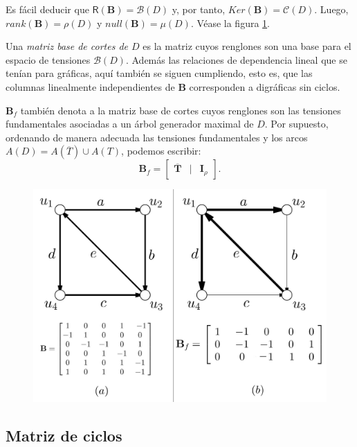 Es fácil deducir que  $\mathsf{R}(\mathbf{B}) =\mathcal{B}(D)$ y, por tanto, $Ker(\mathbf{B}) = \mathcal{C}(D)$. Luego, $rank(\mathbf{B}) = \rho(D)$ y $null(\mathbf{B}) = \mu(D)$. Véase la figura \ref{fig:matrizdecortesdirigidos}.

Una \textit{matriz base de cortes de $D$} es la matriz cuyos renglones son una base para el espacio de tensiones $\mathcal{B}(D)$. Además las relaciones de dependencia lineal que se tenían para gráficas, aquí también se siguen cumpliendo, esto es, que las columnas linealmente independientes de $\mathbf{B}$ corresponden a digráficas sin ciclos.

$\mathbf{B}_{f}$ también denota a la matriz base de cortes cuyos renglones son las tensiones fundamentales asociadas a un árbol generador maximal de $D$. Por supuesto, ordenando de manera adecuada las tensiones fundamentales y los arcos $A(D) = A(\overline{T}) \cup A(T)$, podemos escribir:
$$
\mathbf{B}_{f} = \begin{bmatrix}
\mathbf{\overline{T}}& | & \mathbf{I}_{\rho}
\end{bmatrix}.
$$

\begin{figure}[H]
    \centering
    \includegraphics[scale=0.25]{img/imgchapter4/matrizdecortesdirigidos.jpg}
    \caption{}
    \label{fig:matrizdecortesdirigidos}
\end{figure}

\subsection{Matriz de ciclos}

